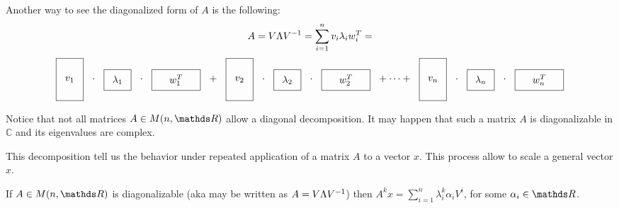 \documentclass[computationalMathematics.tex]{subfiles}
\begin{document}
Another way to see the diagonalized form of $A$ is the following:
\[
  A = V \Lambda {V}^{-1} = \sum\limits_{i=1}^{n} v_i\lambda_i w_i^T = 
\]
\[
  \tallthin{$v_1$} \cdot \real{$\lambda_1$} \cdot \shortlarge{$w_1^T$} + \tallthin{$v_2$} \cdot \real{$\lambda_2$} \cdot \shortlarge{$w_2^T$} + \cdots + \tallthin{$v_n$} \cdot \real{$\lambda_n$} \cdot \shortlarge{$w_n^T$}
\]


Notice that not all matrices $A \in M(n, \R)$ allow a diagonal decomposition.
It may happen that such a matrix $A$ is diagonalizable in $\mathds{C}$ and its eigenvalues are complex.

\noindent This decomposition tell us the behavior under repeated application of a matrix $A$ to a vector $x$. This process allow to scale a general vector $x$.\\


\begin{proposition}
  If $A \in M(n, \R)$ is diagonalizable (aka may be written as $A = V \Lambda {V}^{-1}$) then $A^k x = \sum\limits_{i=1}^{n} \lambda_i^k \alpha_i V^i$, for some $\alpha_i \in \R$.
\end{proposition}
\end{document}
